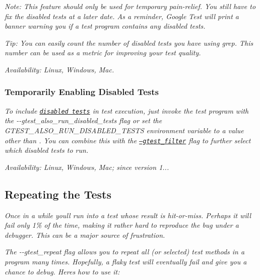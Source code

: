 {\itshape {\itshape Note\+:} This feature should only be used for temporary pain-\/relief. You still have to fix the disabled tests at a later date. As a reminder, Google Test will print a banner warning you if a test program contains any disabled tests.}

{\itshape {\itshape Tip\+:} You can easily count the number of disabled tests you have using {\ttfamily grep}. This number can be used as a metric for improving your test quality.}

{\itshape {\itshape Availability\+:} Linux, Windows, Mac.}

{\itshape \subsubsection*{Temporarily Enabling Disabled Tests}}

{\itshape }

{\itshape To include \href{#temporarily-disabling-tests}{\tt disabled tests} in test execution, just invoke the test program with the {\ttfamily -\/-\/gtest\+\_\+also\+\_\+run\+\_\+disabled\+\_\+tests} flag or set the {\ttfamily G\+T\+E\+S\+T\+\_\+\+A\+L\+S\+O\+\_\+\+R\+U\+N\+\_\+\+D\+I\+S\+A\+B\+L\+E\+D\+\_\+\+T\+E\+S\+TS} environment variable to a value other than {}. You can combine this with the \href{#running-a-subset-of-the-tests}{\tt --gtest\+\_\+filter} flag to further select which disabled tests to run.}

{\itshape {\itshape Availability\+:} Linux, Windows, Mac; since version 1...}

{\itshape \subsection*{Repeating the Tests}}

{\itshape }

{\itshape Once in a while you\textquotesingle{}ll run into a test whose result is hit-\/or-\/miss. Perhaps it will fail only 1\% of the time, making it rather hard to reproduce the bug under a debugger. This can be a major source of frustration.}

{\itshape The {\ttfamily -\/-\/gtest\+\_\+repeat} flag allows you to repeat all (or selected) test methods in a program many times. Hopefully, a flaky test will eventually fail and give you a chance to debug. Here\textquotesingle{}s how to use it\+:}

